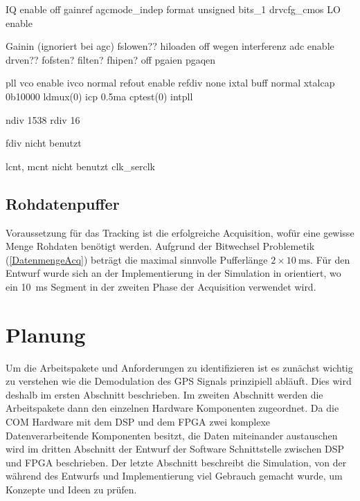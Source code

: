 IQ enable off
gainref 
agcmode_indep
format unsigned
bits_1
drvcfg_cmos
LO enable

Gainin (ignoriert bei agc)
fslowen??
hiloaden off wegen interferenz
adc enable
drven??
fofsten?
filten?
fhipen? off
pgaien
pgaqen

pll vco enable
ivco normal
refout enable
refdiv none
ixtal buff normal
xtalcap 0b10000
ldmux(0)
icp 0.5ma
cptest(0)
intpll

ndiv 1538
rdiv 16

fdiv nicht benutzt

lcnt, mcnt nicht benutzt
clk_serclk

\subsection{Rohdatenpuffer}
Voraussetzung für das Tracking ist die erfolgreiche Acquisition, wofür eine gewisse Menge Rohdaten benötigt werden. Aufgrund der Bitwechsel Problemetik (\ref{DatenmengeAcq}) beträgt die maximal sinnvolle Pufferlänge $2\times\SI{10}{\ms}$. Für den Entwurf wurde sich an der Implementierung in der Simulation in \cite{borre2007software} orientiert, wo ein \SI{10}{\ms} Segment in der zweiten Phase der Acquisition verwendet wird.




 


\section{Planung}
Um die Arbeitspakete und Anforderungen zu identifizieren ist es zunächst wichtig zu verstehen wie die Demodulation des GPS Signals prinzipiell abläuft. Dies wird deshalb im ersten Abschnitt beschrieben. Im zweiten Abschnitt werden die Arbeitspakete dann den einzelnen Hardware Komponenten zugeordnet. Da die COM Hardware mit dem DSP und dem FPGA zwei komplexe Datenverarbeitende Komponenten besitzt, die Daten miteinander austauschen wird im dritten Abschnitt der Entwurf der Software Schnittstelle zwischen DSP und FPGA beschrieben. Der letzte Abschnitt beschreibt die Simulation, von der während des Entwurfs und Implementierung viel Gebrauch gemacht wurde, um Konzepte und Ideen zu prüfen.

